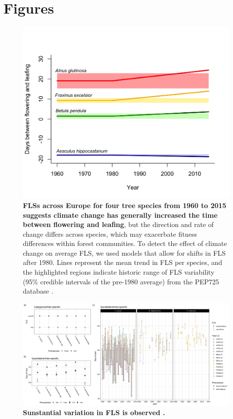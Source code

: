 \documentclass{article}
\begin{document}
{\section*{Figures}
\begin{figure}[h!]
    \centering
 \includegraphics[width=\textwidth]{..//PEP725/FLS_climate_change.jpeg} 
    \caption{\textbf{FLSs across Europe for four tree species from 1960 to 2015 suggests climate change has generally increased the time between flowering and leafing}, but the direction and rate of change differs across species, which may exacerbate fitness differences within forest communities. To detect the effect of climate change on average FLS, we used models that allow for shifts in FLS after 1980. Lines represent the mean trend in FLS per species, and the highlighted regions indicate historic range of FLS variability (95\% credible intervals of the pre-1980 average) from the PEP725 database \citep{PEP725}.}
    \label{fig:climchange}
\end{figure}
 
 \begin{figure}[h!]
        \centering
          \includegraphics[width=\textwidth]{..//HarvardForest/FLS_viz.jpeg}
          \caption{\textbf{Sunstantial variation in FLS is observed .}  }
        \label{fig:vizzy}
    \end{figure}

}
\end{document}
